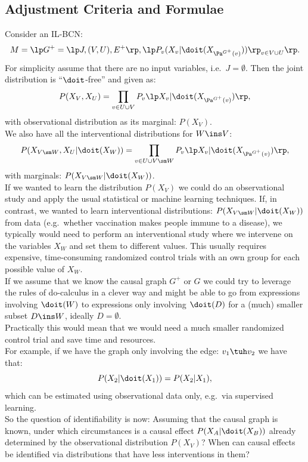 \subsection{Adjustment Criteria and Formulae}


\begin{Motivation}
    Consider an IL-BCN:
        \[M= \lp G^+=\lp J,(V,U),E^+ \rp, \lp P_v ( X_v|\doit( X_{\Pa^{G^+}(v)})) \rp_{v \in V \cup U} \rp.\]
For simplicity assume that there are no input variables, i.e.\ $J=\emptyset$.
Then the joint distribution is ``$\doit$-free'' and given as:
\[P(X_V,X_U) = \prod_{v \in U\cup V}P_v\lp X_v|\doit(X_{\Pa^{G^+}(v)})\rp,   \]
with observational distribution as its marginal: $P(X_V)$.\\
We also have all the interventional distributions for $W \ins V$:
\[P(X_{V \sm W},X_U|\doit(X_W)) = \prod_{v \in U \cup V \sm W}P_v\lp X_v|\doit(X_{\Pa^{G^+}(v)})\rp,\]
with marginals: $P(X_{V\sm W}|\doit(X_W))$.\\
If we wanted to learn the distribution $P(X_V)$ we could do an observational study and apply the usual statistical or machine learning techniques.
If, in contrast, we wanted to learn interventional distributions: $P(X_{V\sm W}|\doit(X_W))$ from data (e.g.\ 
whether vaccination makes people immune to a disease),
we typically would need to perform an interventional study where we intervene on the variables $X_W$ and set them to different values.
This usually requires expensive, time-consuming randomized control trials with an own group for each possible 
value of $X_W$.\\
If we assume that we know the causal graph $G^+$ or $G$ we could try to leverage the rules of do-calculus in a clever way and might be able to go from expressions involving $\doit(W)$ to expressions only involving $\doit(D)$ 
for a (much) smaller subset $D \ins W$, ideally $D=\emptyset$.\\
Practically this would mean that we would need a much smaller randomized control trial and save time and resources.\\
For example, if we have the graph only involving the edge: $v_1 \tuh v_2$ we have that:
\[ P(X_2|\doit(X_1)) =  P(X_2|X_1), \]
which can be estimated using observational data only, e.g.\ via supervised learning.\\
So the question of identifiability is now: 
Assuming that the causal graph is known, under which circumstances is a causal effect 
$P(X_A|\doit(X_B))$ already determined by the observational distribution $P(X_V)$?
When can causal effects be identified via distributions that have less interventions in them?
\end{Motivation}

